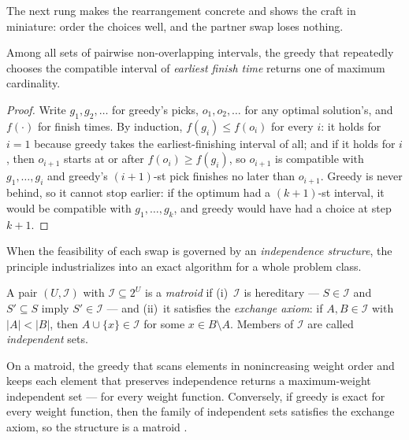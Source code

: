 The next rung makes the rearrangement concrete and shows the craft in miniature: order
the choices well, and the partner swap loses nothing.

\begin{theorem}\label{thm:exc-staysahead}
Among all sets of pairwise non-overlapping intervals, the greedy that repeatedly
chooses the compatible interval of \emph{earliest finish time} returns one of maximum
cardinality. \eop
\end{theorem}

\begin{proof}
Write $g_1,g_2,\dots$ for greedy's picks, $o_1,o_2,\dots$ for any optimal solution's,
and $f(\cdot)$ for finish times. By induction, $f(g_i)\le f(o_i)$ for every $i$: it
holds for $i=1$ because greedy takes the earliest-finishing interval of all; and if it
holds for $i$, then $o_{i+1}$ starts at or after $f(o_i)\ge f(g_i)$, so $o_{i+1}$ is
compatible with $g_1,\dots,g_i$ and greedy's $(i{+}1)$-st pick finishes no later than
$o_{i+1}$. Greedy is never behind, so it cannot stop earlier: if the optimum had a
$(k{+}1)$-st interval, it would be compatible with $g_1,\dots,g_k$, and greedy would
have had a choice at step $k{+}1$.
\end{proof}

When the feasibility of each swap is governed by an \emph{independence structure}, the
principle industrializes into an exact algorithm for a whole problem class.

\begin{definition}[Matroid]\label{def:exc-matroid}
A pair $(U,\mathcal{I})$ with $\mathcal{I}\subseteq 2^U$ is a \emph{matroid} if
(i)~$\mathcal{I}$ is hereditary --- $S\in\mathcal{I}$ and $S'\subseteq S$ imply
$S'\in\mathcal{I}$ --- and (ii)~it satisfies the \emph{exchange axiom}: if
$A,B\in\mathcal{I}$ with $|A|<|B|$, then $A\cup\{x\}\in\mathcal{I}$ for some
$x\in B\setminus A$. Members of $\mathcal{I}$ are called \emph{independent} sets.
\end{definition}

\begin{theorem}\label{thm:exc-matroid}
On a matroid, the greedy that scans elements in nonincreasing weight order and keeps
each element that preserves independence returns a maximum-weight independent set ---
for every weight function. Conversely, if greedy is exact for every weight function,
then the family of independent sets satisfies the exchange axiom, so the structure is
a matroid \citep{exchange-greedy-bg1}. \eop
\end{theorem}

